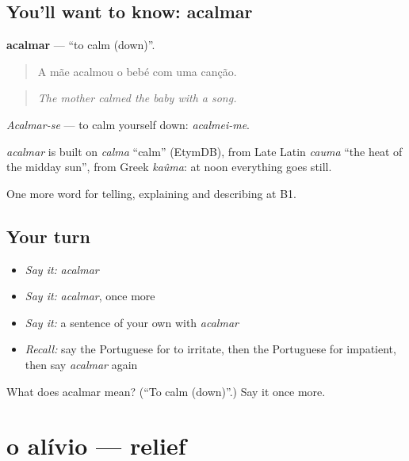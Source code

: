 \subsection*{You'll want to know: acalmar}
\textbf{acalmar} — \textquotedblleft{}to calm (down)\textquotedblright{}.

\begin{quote}
A mãe acalmou o bebé com uma canção.
\end{quote}

\begin{quote}
\emph{The mother calmed the baby with a song.}
\end{quote}

\emph{Acalmar-se} — to calm yourself down: \emph{acalmei-me}.

\begin{cousinweb}
\emph{acalmar} is built on \emph{calma} \textquotedblleft{}calm\textquotedblright{} (EtymDB), from Late Latin \emph{cauma} \textquotedblleft{}the heat of the midday sun\textquotedblright{}, from Greek \emph{kaûma}: at noon everything goes still.
\end{cousinweb}

\begin{grammarlens}[title={What you've built}]
One more word for telling, explaining and describing at B1.
\end{grammarlens}

\subsection*{Your turn}
\begin{itemize}
\raggedright
  \item \emph{Say it:} \emph{acalmar}
  \item \emph{Say it:} \emph{acalmar}, once more
  \item \emph{Say it:} a sentence of your own with \emph{acalmar}
  \item \emph{Recall:} say the Portuguese for to irritate, then the Portuguese for impatient, then say \emph{acalmar} again
\end{itemize}

\begin{tcolorbox}[breakable,colback=teal!4,colframe=teal!35!black,title={Before you move on}]
What does acalmar mean? (\textquotedblleft{}To calm (down)\textquotedblright{}.) Say it once more.
\end{tcolorbox}
\section[o alívio]{o alívio — relief}

